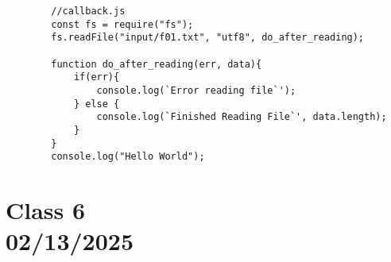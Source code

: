 \documentclass{article}
\begin{document}
\begin{itemize}
\begin{lstlisting}
        //callback.js
        const fs = require("fs");
        fs.readFile("input/f01.txt", "utf8", do_after_reading);

        function do_after_reading(err, data){
            if(err){
                console.log(`Error reading file`');
            } else {
                console.log(`Finished Reading File`', data.length);
            }
        }
        console.log("Hello World");
    \end{lstlisting}
\end{itemize}

\pagebreak
\section*{Class 6 \\ 02/13/2025}\label{sec:Class 6}
\end{document}
